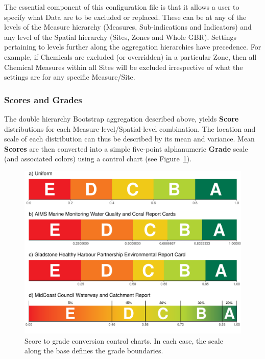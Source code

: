 The essential component of this configuration file is that it allows a user to specify what Data are
to be excluded or replaced. These can be at any of the levels of the Measure hierarchy (Measures,
Sub-indications and Indicators) and any level of the Spatial hierarchy (Sites, Zones and Whole GBR).
Settings pertaining to levels further along the aggregation hierarchies have precedence. For
example, if Chemicals are excluded (or overridden) in a particular Zone, then all Chemical Measures
within all Sites will be excluded irrespective of what the settings are for any specific
Measure/Site.

\subsubsection{Scores and Grades}

The double hierarchy Bootstrap aggregation described above, yields \textbf{Score} distributions for
each Measure-level/Spatial-level combination. The location and scale of each distribution can thus
be described by its mean and variance. Mean \textbf{Scores} are then converted into a simple
five-point alphanumeric \textbf{Grade} scale (and associated colors) using a control chart (see
Figure~\ref{fig:control}).

\begin{figure}[ht]
  \includegraphics[width=\linewidth]{figures/Diagrams/controlcharts.pdf}
  \caption{Score to grade conversion control charts.  In each case, the scale along the base defines the grade
  boundaries.}\label{fig:control}
\end{figure}

